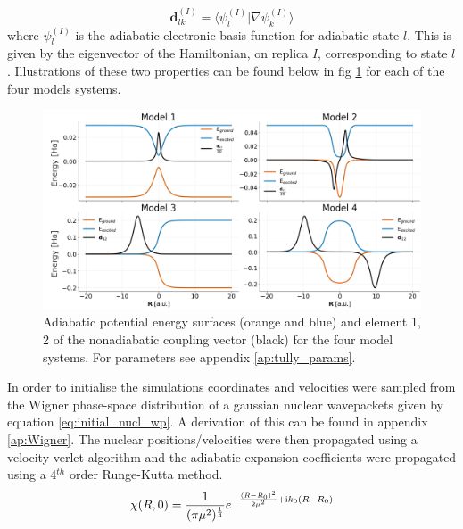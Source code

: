 \begin{equation}
  \mathbf{d}_{lk}^{(I)} = \langle \psi_{l}^{(I)} | \nabla \psi_k^{(I)} \rangle
  \label{eq:NACV_def}
\end{equation}
where $\psi_{l}^{(I)}$ is the adiabatic electronic basis function for adiabatic state $l$. This is given by the eigenvector of the Hamiltonian, on replica $I$, corresponding to state $l$. Illustrations of these two properties can be found below in fig \ref{fig:tully_schematics} for each of the four models systems.
\begin{figure}[H]
  \includegraphics[width=\textwidth]{../Chapter_tullyModels/model_schematics_review.png}
  \caption{\label{fig:tully_schematics}Adiabatic potential energy surfaces (orange and blue) and element 1, 2 of the nonadiabatic coupling vector (black) for the four model systems. For parameters see appendix \ref{ap:tully_params}.}
\end{figure}
\newpage
\noindent In order to initialise the simulations coordinates and velocities were sampled from the Wigner phase-space distribution of a gaussian nuclear wavepackets given by equation \eqref{eq:initial_nucl_wp}. A derivation of this can be found in appendix \ref{ap:Wigner}. The nuclear positions/velocities were then propagated using a velocity verlet algorithm and the adiabatic expansion coefficients were propagated using a 4$^{th}$ order Runge-Kutta method.
\begin{equation}
  \chi(R, 0) = \frac{1}{(\pi \mu^2)^{\frac{1}{4}}} e^{-\frac{(R - R_0)^2}{2 \mu^2} + \mathrm{i} k_0 (R - R_0) }
  \label{eq:initial_nucl_wp}
\end{equation}
